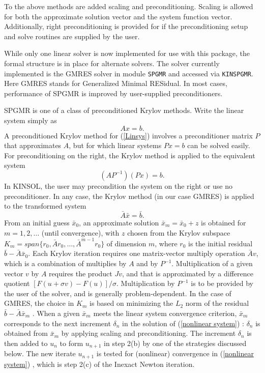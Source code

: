\documentclass[11pt]{article}
\begin{document}
To the above methods are added scaling and preconditioning. Scaling is allowed
for both the approximate solution vector and the system function vector. 
Additionally, right preconditioning is provided for if the preconditioning 
setup and solve routines are supplied by the user.

While only one linear solver is now implemented for use with this package, the
formal structure is in place for alternate solvers. The solver currently
implemented is the GMRES solver \cite{BrHi89,SaSc86} in module {\tt SPGMR} and
accessed via {\tt KINSPGMR}. Here GMRES stands for Generalized Minimal RESidual.
In most cases, performance of SPGMR is improved by user-supplied 
preconditioners.  

SPGMR is one of a class of preconditioned Krylov methods.  Write the
linear system  simply as
\begin{equation}
 A x = b . \label{Linsys}
\end{equation}
A preconditioned Krylov method for (\ref{Linsys}) involves a
preconditioner matrix $P$ that approximates $A$, but for which
linear systems $Px=b$ can be solved easily.  For preconditioning
on the right, the Krylov method is applied to the equivalent system
\[
 (A P^{-1}) (P x) = b .
\]
In KINSOL, the user may precondition the system on the right or use no 
preconditioner. In any case, the Krylov method (in our case GMRES) is applied to the transformed system
\[
 \bar{A} \bar{x} = \bar{b} .
\]
From an initial guess $\bar{x}_0$, an approximate solution 
$\bar{x}_m = \bar{x}_0 + z$ is obtained for $m = 1, 2, \ldots$ 
(until convergence), with $z$ chosen from the Krylov subspace
$K_m = span\{r_0, \bar{A}r_0, \ldots, \bar{A}^{m-1}r_0\}$ 
of dimension $m$, where $r_0$ is the initial residual 
$\bar{b} - \bar{A} \bar{x}_0$.  Each Krylov iteration requires one
matrix-vector multiply operation $\bar{A} v$, which is a combination
of multiplies by $A$ and by $P^{-1}$.  Multiplication of a given
vector $v$ by $A$ requires the product $Jv$, and that is approximated 
by a difference quotient $[F(u+\sigma v) - F(u)]/\sigma$.
Multiplication by $P^{-1}$ is to be provided by the user of the
solver, and is generally problem-dependent.  In the case of GMRES, 
the choice in $K_m$ is based on minimizing the $L_2$ norm of the
residual $\bar{b} - \bar{A} \bar{x}_m$ \cite{BrHi89,SaSc86}. When a given
$\bar{x}_m$ meets the linear system convergence criterion, $\bar{x}_m$ 
corresponds to the next increment $\delta_n$ in the solution of (\ref{nonlinear
system}) : $\delta_n$ is obtained from $\bar{x}_m$ by applying scaling
and preconditioning. The increment $\delta_n$ is then added to $u_n$ to form 
$u_{n+1}$ in step 2(b) by one of the strategies discussed below. The new
iterate $u_{n+1}$ is tested for (nonlinear) convergence in (\ref{nonlinear 
system}) , which is step 2(c) of the Inexact Newton iteration.
\end{document}
